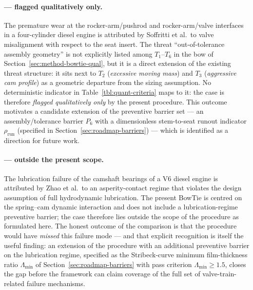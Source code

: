 \paragraph{\citet{soffritti2018wornvalvetrain} --- flagged
qualitatively only.}
The premature wear at the rocker-arm/pushrod and rocker-arm/valve
interfaces in a four-cylinder diesel engine is attributed by
Soffritti et al.\ to valve misalignment with respect to the seat
insert. The threat ``out-of-tolerance assembly geometry'' is not
explicitly listed among $T_{1}$--$T_{6}$ in the bow of
Section~\ref{sec:method-bowtie-qual}, but it is a direct extension
of the existing threat structure: it sits next to $T_{2}$
(\emph{excessive moving mass}) and $T_{3}$
(\emph{aggressive cam profile}) as a geometric departure from the
sizing assumption. No deterministic indicator in
Table~\ref{tbl:quant-criteria} maps to it: the case is therefore
\emph{flagged qualitatively only} by the present procedure. This
outcome motivates a candidate extension of the preventive barrier
set --- an assembly/tolerance barrier $P_{6}$ with a dimensionless
stem-to-seat runout indicator $\rho_{\mathrm{run}}$ (specified in
Section~\ref{sec:roadmap-barriers}) --- which is identified as a
direction for future work.

\paragraph{\citet{zhao2023camshaftV6} --- outside the present
scope.}
The lubrication failure of the camshaft bearings of a V6 diesel
engine is attributed by Zhao et al.\ to an asperity-contact regime
that violates the design assumption of full hydrodynamic
lubrication. The present BowTie is centred on the spring--cam
dynamic interaction and does not include a lubrication-regime
preventive barrier; the case therefore lies outside the scope of
the procedure as formulated here. The honest outcome of the
comparison is that the procedure would have \emph{missed} this
failure mode --- and that explicit recognition is itself the
useful finding: an extension of the procedure with an additional
preventive barrier on the lubrication regime, specified as the
Stribeck-curve minimum film-thickness ratio $\Lambda_{\min}$ of
Section~\ref{sec:roadmap-barriers} with pass criterion
$\Lambda_{\min}\geq 1.5$, closes the gap before the framework can
claim coverage of the full set of valve-train-related failure
mechanisms.

